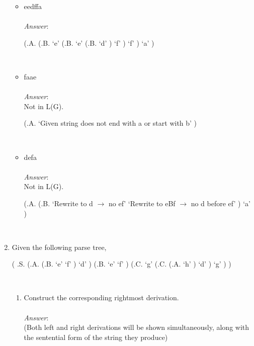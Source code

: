 \documentclass[fleqn]{article}
\begin{document}
\begin{enumerate}
\begin{itemize}
    \hfill\newline\hfill\newline
    \item eedffa\\\\
    \textit{Answer}:\\
    \begin{parsetree}
      (.A.
        (.B.
          `e'
          (.B.
            `e'
            (.B.
              `d'
            )
            `f'
          )
          `f'
        )
        `a'
      )
    \end{parsetree}\\

    \item faae\\\\
    \textit{Answer}:\\
    Not in L(G).
    \begin{parsetree}
      (.A.
        `Given string does not end with a or start with b'
      )
    \end{parsetree}\\

    \item defa\\\\
    \textit{Answer}:\\
    Not in L(G).
    \begin{parsetree}
      (.A.
        (.B.
          `Rewrite to d $\rightarrow$ no ef'
          `Rewrite to eBf $\rightarrow$ no d before ef'
        )
        `a'
      )
    \end{parsetree}\\
  \end{itemize}

  \newpage
  \item Given the following parse tree,
  \begin{parsetree}
    ( .S.
      (.A.
        (.B.
          `e'
          `f'
        )
        `d'
      )
      (.B.
        `e'
        `f'
      )
      (.C.
        `g'
        (.C.
          (.A.
            `h'
          )
          `d'
        )
        `g'
      )
    )
  \end{parsetree}\\

  \begin{enumerate}
    \item Construct the corresponding rightmost derivation.\\\\
    \textit{Answer}:\\
    (Both left and right derivations will be shown simultaneously, along with the sentential form of the string they produce)\\


\end{enumerate}
\end{enumerate}
\end{document}
